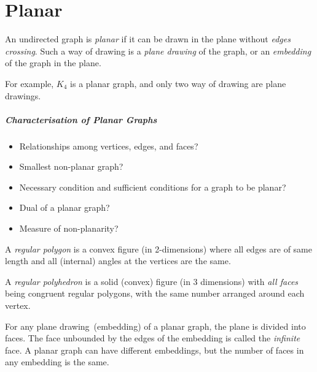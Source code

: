 \chapter{Planar}

\begin{definition}[Planar]
An undirected graph is \emph{planar}
if it can be drawn in the plane without \emph{edges crossing}.
Such a way of drawing is a \emph{plane drawing} of the graph,
or an \emph{embedding} of the graph in the plane.
\end{definition}
For example, $K_4$ is a planar graph, and only two way of drawing are plane drawings.

\paragraph{Characterisation of Planar Graphs}
\begin{itemize}
\item
Relationships among vertices, edges, and faces?
\item
Smallest non-planar graph?
\item
Necessary condition and sufficient conditions for a graph to be planar?
\item
Dual of a planar graph?
\item
Measure of non-planarity?
\end{itemize}

\begin{definition}
A \emph{regular polygon} is a convex figure (in 2-dimensions) where all edges are of same length and all (internal) angles at the vertices are the same.

A \emph{regular polyhedron} is a solid (convex) figure (in 3 dimensions) with \emph{all faces} being congruent regular polygons, with the same number arranged around each vertex.
\end{definition}
\begin{remark}
For any plane drawing~(embedding) of a planar graph, the plane is divided into faces. 
The face unbounded by the edges of the embedding is called the \emph{infinite} face.
A planar graph can have different embeddings, but the number of faces in any embedding is the same.
\end{remark}
